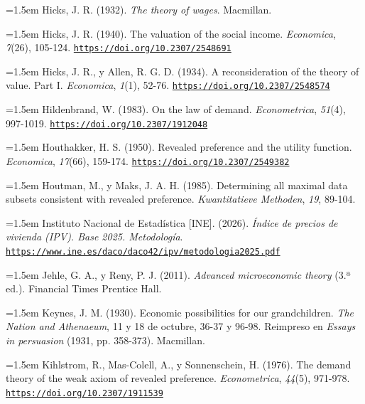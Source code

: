 \documentclass[10pt,a4paper]{article}
\begin{document}
\noindent\hangindent=1.5em Hicks, J. R. (1932). \textit{The theory of wages}. Macmillan.

{\sloppy\noindent\hangindent=1.5em Hicks, J. R. (1940). The valuation of the social income. \textit{Economica}, \textit{7}(26), 105-124. \href{https://doi.org/10.2307/2548691}{\nolinkurl{https://doi.org/10.2307/2548691}}\par}

\noindent\hangindent=1.5em Hicks, J. R., y Allen, R. G. D. (1934). A reconsideration of the theory of value. Part I. \textit{Economica}, \textit{1}(1), 52-76. \href{https://doi.org/10.2307/2548574}{\nolinkurl{https://doi.org/10.2307/2548574}}

\noindent\hangindent=1.5em Hildenbrand, W. (1983). On the law of demand. \textit{Econometrica}, \textit{51}(4), 997-1019. \href{https://doi.org/10.2307/1912048}{\nolinkurl{https://doi.org/10.2307/1912048}}

\noindent\hangindent=1.5em Houthakker, H. S. (1950). Revealed preference and the utility function. \textit{Economica}, \textit{17}(66), 159-174. \href{https://doi.org/10.2307/2549382}{\nolinkurl{https://doi.org/10.2307/2549382}}

\noindent\hangindent=1.5em Houtman, M., y Maks, J. A. H. (1985). Determining all maximal data subsets consistent with revealed preference. \textit{Kwantitatieve Methoden}, \textit{19}, 89-104.

{\sloppy\noindent\hangindent=1.5em Instituto Nacional de Estadística [INE]. (2026). \textit{Índice de precios de vivienda (IPV). Base 2025. Metodología}. \href{https://www.ine.es/daco/daco42/ipv/metodologia2025.pdf}{\nolinkurl{https://www.ine.es/daco/daco42/ipv/metodologia2025.pdf}}\par}

\noindent\hangindent=1.5em Jehle, G. A., y Reny, P. J. (2011). \textit{Advanced microeconomic theory} (3.ª ed.). Financial Times Prentice Hall.

\noindent\hangindent=1.5em Keynes, J. M. (1930). Economic possibilities for our grandchildren. \textit{The Nation and Athenaeum}, 11 y 18 de octubre, 36-37 y 96-98. Reimpreso en \textit{Essays in persuasion} (1931, pp. 358-373). Macmillan.

\noindent\hangindent=1.5em Kihlstrom, R., Mas-Colell, A., y Sonnenschein, H. (1976). The demand theory of the weak axiom of revealed preference. \textit{Econometrica}, \textit{44}(5), 971-978. \href{https://doi.org/10.2307/1911539}{\nolinkurl{https://doi.org/10.2307/1911539}}
\end{document}
